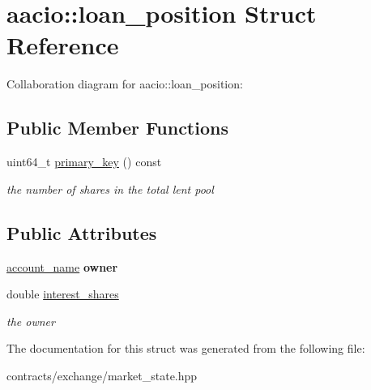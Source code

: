 \hypertarget{structaacio_1_1loan__position}{}\section{aacio\+:\+:loan\+\_\+position Struct Reference}
\label{structaacio_1_1loan__position}


Collaboration diagram for aacio\+:\+:loan\+\_\+position\+:
\subsection*{Public Member Functions}
\begin{DoxyCompactItemize}
\item 
\mbox{\label{structaacio_1_1loan__position_a8aa2067d4339ac40402b92564693ccc9}} 
uint64\+\_\+t \mbox{\hyperlink{structaacio_1_1loan__position_a8aa2067d4339ac40402b92564693ccc9}{primary\+\_\+key}} () const
\begin{DoxyCompactList}\small\item\em the number of shares in the total lent pool \end{DoxyCompactList}\end{DoxyCompactItemize}
\subsection*{Public Attributes}
\begin{DoxyCompactItemize}
\item 
\mbox{\label{structaacio_1_1loan__position_add1e5127884b3248e6723b11b1971439}} 
\mbox{\hyperlink{structaacio_1_1chain_1_1name}{account\+\_\+name}} {\bfseries owner}
\item 
\mbox{\label{structaacio_1_1loan__position_a6738f2ed99509b25bd484f6a502589aa}} 
double \mbox{\hyperlink{structaacio_1_1loan__position_a6738f2ed99509b25bd484f6a502589aa}{interest\+\_\+shares}}
\begin{DoxyCompactList}\small\item\em the owner \end{DoxyCompactList}\end{DoxyCompactItemize}


The documentation for this struct was generated from the following file\+:\begin{DoxyCompactItemize}
\item 
contracts/exchange/market\+\_\+state.\+hpp\end{DoxyCompactItemize}
